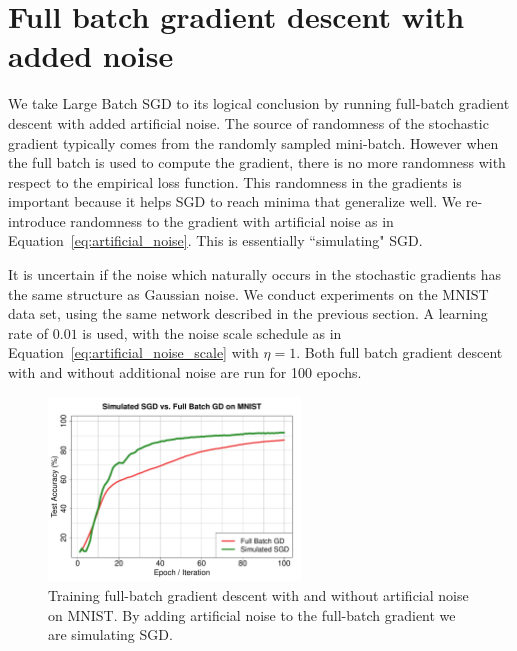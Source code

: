 \documentclass{article} %
\begin{document}
\section{Full batch gradient descent with added noise}
We take Large Batch SGD to its logical conclusion by running full-batch gradient descent with added artificial noise.
The source of randomness of the stochastic gradient typically comes from the randomly sampled mini-batch.
However when the full batch is used to compute the gradient, there is no more randomness with respect to the empirical loss function.
This randomness in the gradients is important because it helps SGD to reach minima that generalize well.
We re-introduce randomness to the gradient with artificial noise as in Equation~\ref{eq:artificial_noise}.
This is essentially ``simulating" SGD.

It is uncertain if the noise which naturally occurs in the stochastic gradients has the same structure as Gaussian noise.
We conduct experiments on the MNIST data set, using the same network described in the previous section.
A learning rate of $0.01$ is used, with the noise scale schedule as in Equation~\ref{eq:artificial_noise_scale} with $\eta = 1$.
Both full batch gradient descent with and without additional noise are run for 100 epochs.

\begin{figure}[t]
\begin{center}
  \includegraphics[width=0.6\textwidth]{mnistSimSGD.pdf}
\end{center}
\caption{Training full-batch gradient descent with and without artificial noise on MNIST.
By adding artificial noise to the full-batch gradient we are simulating SGD.
}
\label{fig:mnist_simSGD}
\end{figure}
\end{document}
